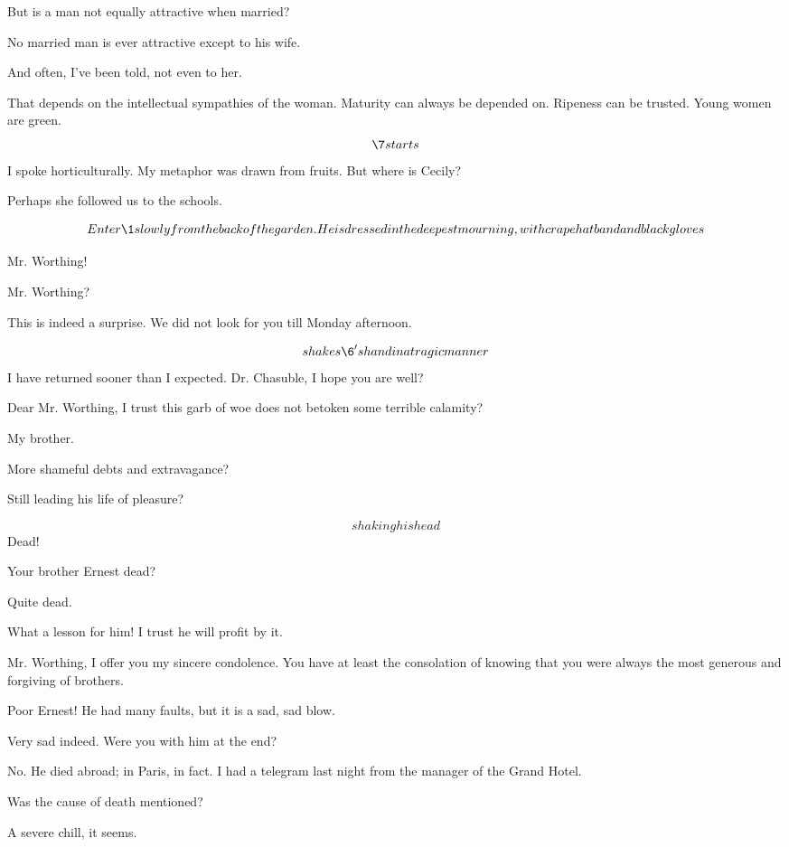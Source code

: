 \documentclass{book}
\begin{document}
\7  But is a man not equally attractive when married?

\6  No married man is ever attractive except to his wife.

\7  And often, I've been told, not even to her.

\6  That depends on the intellectual sympathies of the
woman.  Maturity can always be depended on.  Ripeness can be
trusted.  Young women are green.  \[\7 starts\]       I spoke
horticulturally.  My metaphor was drawn from fruits.  But where is
Cecily?

\7  Perhaps she followed us to the schools.


\[Enter \1 slowly from the back of the garden.  He is dressed in
the deepest mourning, with crape hatband and black gloves\]

\6  Mr. Worthing!

\7  Mr. Worthing?

\6  This is indeed a surprise.  We did not look for you
till Monday afternoon.

\1\[shakes \6's hand in a tragic manner\]  I have
returned sooner than I expected.  Dr. Chasuble, I hope you are well?

\7  Dear Mr. Worthing, I trust this garb of woe does not
betoken some terrible calamity?

\1  My brother.

\6  More shameful debts and extravagance?

\7  Still leading his life of pleasure?

\1  \[shaking his head\]                      Dead!

\7  Your brother Ernest dead?

\1  Quite dead.

\6  What a lesson for him!  I trust he will profit by it.

\7  Mr. Worthing, I offer you my sincere condolence.  You
have at least the consolation of knowing that you were always the
most generous and forgiving of brothers.

\1  Poor Ernest!  He had many faults, but it is a sad, sad blow.

\7  Very sad indeed.  Were you with him at the end?

\1  No.  He died abroad; in Paris, in fact.  I had a telegram
last night from the manager of the Grand Hotel.

\7  Was the cause of death mentioned?

\1  A severe chill, it seems.
\end{document}

